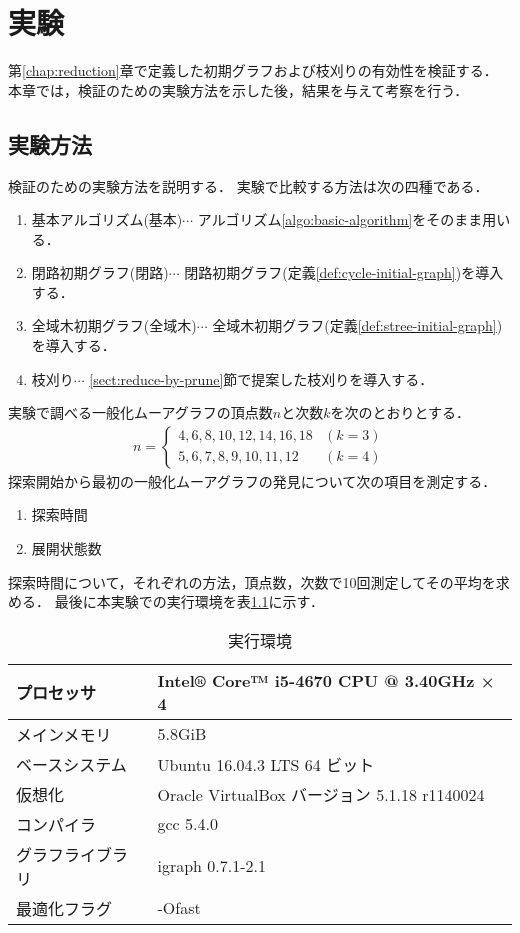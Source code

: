 
\chapter{実験}
\label{sect:experiment}
第\ref{chap:reduction}章で定義した初期グラフおよび枝刈りの有効性を検証する．
本章では，検証のための実験方法を示した後，結果を与えて考察を行う．

\section{実験方法}
検証のための実験方法を説明する．
実験で比較する方法は次の四種である．
\begin{enumerate}
\item 基本アルゴリズム(基本)$\cdots$
  アルゴリズム\ref{algo:basic-algorithm}をそのまま用いる．
\item 閉路初期グラフ(閉路)$\cdots$
  閉路初期グラフ(定義\ref{def:cycle-initial-graph})を導入する．
\item 全域木初期グラフ(全域木)$\cdots$
  全域木初期グラフ(定義\ref{def:stree-initial-graph})を導入する．
\item 枝刈り$\cdots$
  \ref{sect:reduce-by-prune}節で提案した枝刈りを導入する．
\end{enumerate}
実験で調べる一般化ムーアグラフの頂点数$n$と次数$k$を次のとおりとする．
\begin{equation*}
  \begin{aligned}
    n=\begin{cases}
      4,6,8,10,12,14,16,18 & (k=3) \\
      5,6,7,8,9,10,11,12 & (k=4)
    \end{cases}
  \end{aligned}
\end{equation*}
探索開始から最初の一般化ムーアグラフの発見について次の項目を測定する．
\begin{enumerate}
\item 探索時間
\item 展開状態数
\end{enumerate}
探索時間について，それぞれの方法，頂点数，次数で10回測定してその平均を求める．
最後に本実験での実行環境を表\ref{tab:env-lab}に示す．
\begin{table}
  \caption{実行環境}
  \label{tab:env-lab}
  \centering
  \begin{tabular}{ll}
    \hline
    プロセッサ & Intel® Core™ i5-4670 CPU @ 3.40GHz × 4 \\ \hline
    メインメモリ & 5.8GiB \\ \hline
    ベースシステム & Ubuntu 16.04.3 LTS 64 ビット \\ \hline
    仮想化 & Oracle VirtualBox バージョン 5.1.18 r1140024 \\ \hline
    コンパイラ & gcc 5.4.0 \\ \hline
    グラフライブラリ & igraph 0.7.1-2.1 \\ \hline
    最適化フラグ & -Ofast \\ \hline
  \end{tabular}
\end{table}

